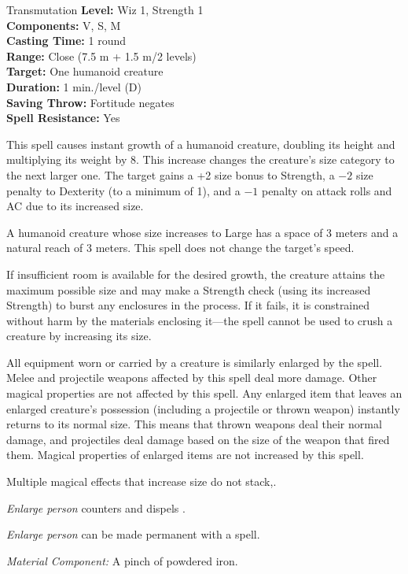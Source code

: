 {Transmutation}
{
	\textbf{Level:}
	Wiz 1, Strength 1\\
	\textbf{Components:}
	V, S, M\\
	\textbf{Casting Time:}
	1 round\\
	\textbf{Range:}
	Close (7.5 m + 1.5 m/2 levels)\\
	\textbf{Target:}
	One humanoid creature\\
	\textbf{Duration:}
	1 min./level (D)\\
	\textbf{Saving Throw:}
	Fortitude negates\\
	\textbf{Spell Resistance:}
	Yes\\
}
{
	This spell causes instant growth of a humanoid creature, doubling its height and multiplying its weight by 8. This increase changes the creature's size category to the next larger one. The target gains a +2 size bonus to Strength, a $-2$ size penalty to Dexterity (to a minimum of 1), and a $-1$ penalty on attack rolls and AC due to its increased size.

	A humanoid creature whose size increases to Large has a space of 3 meters and a natural reach of 3 meters. This spell does not change the target's speed.

	If insufficient room is available for the desired growth, the creature attains the maximum possible size and may make a Strength check (using its increased Strength) to burst any enclosures in the process. If it fails, it is constrained without harm by the materials enclosing it---the spell cannot be used to crush a creature by increasing its size.

	All equipment worn or carried by a creature is similarly enlarged by the spell. Melee and projectile weapons affected by this spell deal more damage. Other magical properties are not affected by this spell. Any enlarged item that leaves an enlarged creature's possession (including a projectile or thrown weapon) instantly returns to its normal size. This means that thrown weapons deal their normal damage, and projectiles deal damage based on the size of the weapon that fired them. Magical properties of enlarged items are not increased by this spell.

	Multiple magical effects that increase size do not stack,.

	\emph{Enlarge person} counters and dispels .

	\emph{Enlarge person} can be made permanent with a  spell.

	\textit{Material Component:}
	A pinch of powdered iron.

}
